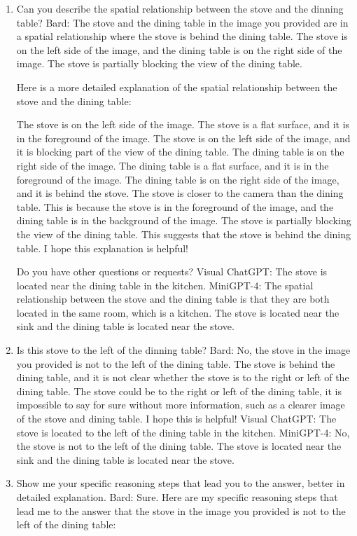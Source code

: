 \begin{enumerate}
    \item Can you describe the spatial relationship between the stove and the dinning table?
    \subitem Bard: 
    The stove and the dining table in the image you provided are in a spatial relationship where the stove is behind the dining table. The stove is on the left side of the image, and the dining table is on the right side of the image. The stove is partially blocking the view of the dining table.
    
    Here is a more detailed explanation of the spatial relationship between the stove and the dining table:
    
    The stove is on the left side of the image. The stove is a flat surface, and it is in the foreground of the image. The stove is on the left side of the image, and it is blocking part of the view of the dining table.
    The dining table is on the right side of the image. The dining table is a flat surface, and it is in the foreground of the image. The dining table is on the right side of the image, and it is behind the stove.
    The stove is closer to the camera than the dining table. This is because the stove is in the foreground of the image, and the dining table is in the background of the image.
    The stove is partially blocking the view of the dining table. This suggests that the stove is behind the dining table.
    I hope this explanation is helpful!
    
    Do you have other questions or requests?
    \subitem Visual ChatGPT: The stove is located near the dining table in the kitchen.
    \subitem MiniGPT-4: The spatial relationship between the stove and the dining table is that they are both located in the same room, which is a kitchen. The stove is located near the sink and the dining table is located near the stove.
    \item Is this stove to the left of the dinning table?
    \subitem Bard: 
    No, the stove in the image you provided is not to the left of the dining table. The stove is behind the dining table, and it is not clear whether the stove is to the right or left of the dining table.
    The stove could be to the right or left of the dining table, it is impossible to say for sure without more information, such as a clearer image of the stove and dining table.
    I hope this is helpful! 
    \subitem Visual ChatGPT: The stove is located to the left of the dining table in the kitchen.
    \subitem MiniGPT-4: No, the stove is not to the left of the dining table. The stove is located near the sink and the dining table is located near the stove.
    \item Show me your specific reasoning steps that lead you to the answer, better in detailed explanation.
    \subitem Bard: 
    Sure. Here are my specific reasoning steps that lead me to the answer that the stove in the image you provided is not to the left of the dining table:
    

\end{enumerate}

